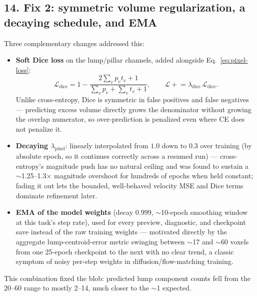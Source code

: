 \documentclass[11pt]{article}
\newcommand{\hsub}[1]{\subsection*{#1}}
\begin{document}
\hsub{14. Fix 2: symmetric volume regularization, a decaying schedule, and EMA}
Three complementary changes addressed this:
\begin{itemize}[nosep]
\item \textbf{Soft Dice loss} on the lump/pillar channels, added alongside
  Eq.~\eqref{eq:pixel-loss}:
  \begin{equation}
  \mathcal{L}_{\text{dice}} = 1 - \frac{2\sum_v p_v t_v + 1}{\sum_v p_v + \sum_v t_v + 1},
  \qquad \mathcal{L} \mathrel{+}= \lambda_{\text{dice}}\,\mathcal{L}_{\text{dice}}.
  \label{eq:dice}
  \end{equation}
  Unlike cross-entropy, Dice is symmetric in false positives and false negatives --- predicting
  excess volume directly grows the denominator without growing the overlap numerator, so
  over-prediction is penalized even where CE does not penalize it.
\item \textbf{Decaying $\lambda_{\text{pixel}}$}: linearly interpolated from $1.0$ down to
  $0.3$ over training (by absolute epoch, so it continues correctly across a resumed run) ---
  cross-entropy's magnitude push has no natural ceiling and was found to sustain a
  $\sim$1.25--1.3$\times$ magnitude overshoot for hundreds of epochs when held constant; fading
  it out lets the bounded, well-behaved velocity MSE and Dice terms dominate refinement later.
\item \textbf{EMA of the model weights} (decay $0.999$, $\sim$10-epoch smoothing window at
  this task's step rate), used for every preview, diagnostic, and checkpoint save instead of
  the raw training weights --- motivated directly by the aggregate lump-centroid-error metric
  swinging between $\sim$17 and $\sim$60 voxels from one 25-epoch checkpoint to the next with
  no clear trend, a classic symptom of noisy per-step weights in diffusion/flow-matching
  training.
\end{itemize}
This combination fixed the blob: predicted lump component counts fell from the 20--60 range
to mostly 2--14, much closer to the $\sim$1 expected.
\end{document}
